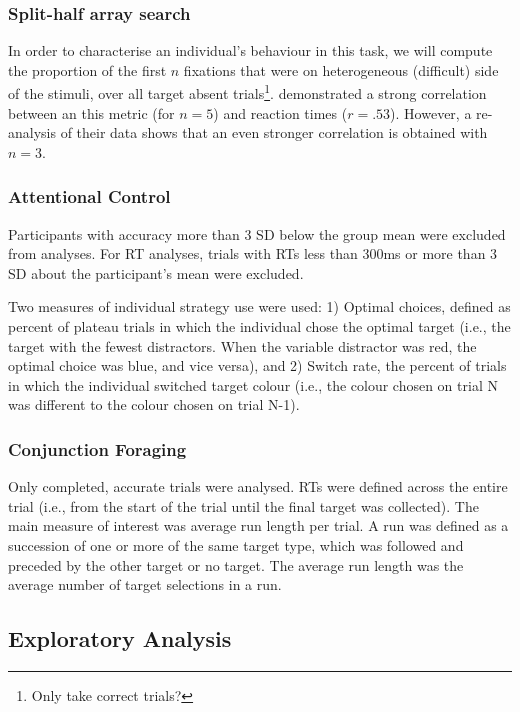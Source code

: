 \documentclass[]{rsos}%
\begin{document}
\subsubsection{Split-half array search}

In order to characterise an individual's behaviour in this task, we will compute the proportion of the first $n$ fixations that were on heterogeneous (difficult) side of the stimuli, over all target absent trials\footnote{Only take correct trials?}. \cite{nowakowsak2017} demonstrated a strong correlation between an this metric (for $n=5$) and reaction times ($r=.53$). However, a re-analysis of their data shows that an even stronger correlation is obtained with $n=3$.

\subsubsection{Attentional Control}

Participants with accuracy more than 3 SD below the group mean were excluded from analyses. For RT analyses, trials with RTs less than 300ms or more than 3 SD about the participant's mean were excluded. 

Two measures of individual strategy use were used: 1) Optimal choices, defined as percent of plateau trials in which the individual chose the optimal target (i.e., the target with the fewest distractors. When the variable distractor was red, the optimal choice was blue, and vice versa), and 2) Switch rate, the percent of trials in which the individual switched target colour (i.e., the colour chosen on trial N was different to the colour chosen on trial N-1).  

\subsubsection{Conjunction Foraging}

Only completed, accurate trials were analysed. RTs were defined across the entire trial (i.e., from the start of the trial until the final target was collected). The main measure of interest was average run length per trial. A run was defined as a succession of one or more of the same target type, which was followed and preceded by the other target or no target. The average run length was the average number of target selections in a run. 

\subsection{Exploratory Analysis}
\end{document}
